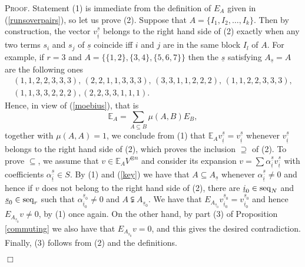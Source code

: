 \documentclass[10pt,a4,twoside,hidelinks,rm]{article}
\newcommand{\seqN}{{\rm seq}_N}
\newcommand{\seqr}{{\rm seq}_r}
\newcommand\be{\mathbb{E}}
\theoremstyle{plain}
\newenvironment{demo}
{\textsc{Proof.}} {\quad \hfill $\Box$}
\begin{document}
\begin{demo}
  Statement (1) is immediate from the definition of $ E_A$ given in (\ref{runsoverpairs}), so
  let us prove (2). Suppose that $ A=\{I_1, I_2, \ldots, I_k \} $. Then by construction, the vector
  $  v_{\underline{i}}^{\underline{s}} $ belongs to the right hand side of (2) exactly when any two 
  terms $ s_i$ and $s_j$ of $ \underline{s}$ coincide iff $ i $ and $ j $ are in the same block $ I_l$ of $ A$.
  For example, if $ r =3 $ and
  $ A= \{ \{ 1,2\},  \{ 3,4\},   \{ 5,6,7\} \}$ then the $ \underline{s}$ satisfying
  $ A_{\underline{s}} = A$ are the following ones 
  \begin{equation}
    \begin{array}{l}
(1,1,2,2,3,3,3), \,(2,2,1,1,3,3,3), \,(3,3,1,1,2,2,2), \,(1,1,2,2,3,3,3), \\(1,1,3,3,2,2,2), (2,2,3,3,1,1,1).
\end{array}
  \end{equation}
  Hence, in view of (\ref{moebius}), that is 
\begin{equation}\label{key}
  \mathbb{E}_A= \sum_{A \subseteq B }\mu(A,B)E_B, 
\end{equation}
together with 
  $ \mu(A,A) = 1 $, we conclude from (1) 
  that $ \mathbb{E}_A  v_{\underline{i}}^{\underline{s}} =  v_{\underline{i}}^{\underline{s}} $
  whenever $  v_{\underline{i}}^{\underline{s}} $ belongs to the right hand side of (2), which proves the inclusion
  $ \supseteq $ of (2). To prove $ \subseteq $, we assume that
  $ v \in \be_A   V^{\otimes n} $ and consider its expansion $ v = \sum
  \alpha_{\underline{i}}^{\underline{s}}  v_{\underline{i}}^{\underline{s}}$ with coefficients 
  $ \alpha_{\underline{i}}^{\underline{s}} \in S$. By (1) and (\ref{key})
  we have that $ A \subseteq A_{\underline{s}} $
  whenever $ \alpha_{\underline{i}}^{\underline{s}} \neq 0 $ and hence
  if $ v $ does not belong to the right hand side of (2), there are
  $\underline{i}_0 \in \seqN $ and $ \underline{s}_0 \in \seqr $ 
  such that $ \alpha_{\underline{i}_0}^{\underline{s}_0} \neq 0 $ and
  $ A  \subsetneqq A_{\underline{s}_0} $.
  We have that $ E_{A_{\underline{s}_0}} v_{\underline{i}_0}^{\underline{s}_0}  = v_{\underline{i}_0}^{\underline{s}_0}  $
      and hence $ E_{A_{\underline{s}_0}} v \neq 0 $, by (1) once again. 
   On the other hand, by
   part (3) of Proposition \ref{commuting} we also have that $ E_{A_{\underline{s}_0}} v= 0 $,
   and this gives the desired
   contradiction.
Finally, (3) follows from (2) and the definitions.

  
\end{demo}
\end{document}
